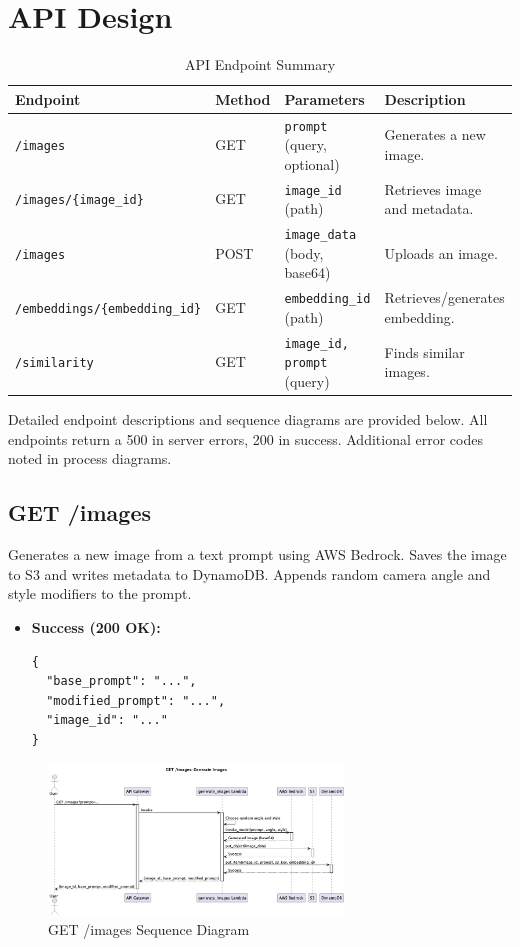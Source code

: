 \documentclass{article}
\begin{document}
\section{API Design}

\begin{table}[h!]
\centering
\begin{tabular}{|l|l|l|l|}
\hline
\textbf{Endpoint} & \textbf{Method} & \textbf{Parameters} & \textbf{Description} \\ \hline
\texttt{/images} & GET & \texttt{prompt} (query, optional) & Generates a new image. \\
\texttt{/images/\{image\_id\}} & GET & \texttt{image\_id} (path) & Retrieves image and metadata. \\
\texttt{/images} & POST & \texttt{image\_data} (body, base64) & Uploads an image. \\
\texttt{/embeddings/\{embedding\_id\}} & GET & \texttt{embedding\_id} (path) & Retrieves/generates embedding. \\
\texttt{/similarity} & GET & \texttt{image\_id, prompt} (query) & Finds similar images. \\ \hline
\end{tabular}
\caption{API Endpoint Summary}
\label{tab:api_summary}
\end{table}

\noindent Detailed endpoint descriptions and sequence diagrams are provided below. All endpoints return a 500 in server errors, 200 in success. Additional error codes noted in process diagrams.

\subsection{GET /images}
Generates a new image from a text prompt using AWS Bedrock. Saves the image to S3 and writes metadata to DynamoDB. Appends random camera angle and style modifiers to the prompt.

\begin{itemize}[noitemsep,topsep=0pt,parsep=0pt,partopsep=0pt]
    \item \textbf{Success (200 OK):}
    \begin{lstlisting}
{
  "base_prompt": "...",
  "modified_prompt": "...",
  "image_id": "..."
}
    \end{lstlisting}
\end{itemize}

\begin{figure}[h!]
  \centering
  \includegraphics[width=0.7\textwidth]{uml/generate_images.png} %
  \caption{GET /images Sequence Diagram}
\end{figure}
\end{document}
